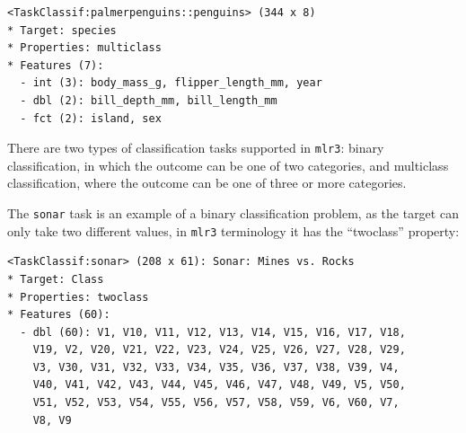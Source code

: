 \begin{Shaded}
\begin{Highlighting}[]
\SpecialCharTok{::} \NormalTok{)}
\end{Highlighting}
\end{Shaded}

\begin{verbatim}
<TaskClassif:palmerpenguins::penguins> (344 x 8)
* Target: species
* Properties: multiclass
* Features (7):
  - int (3): body_mass_g, flipper_length_mm, year
  - dbl (2): bill_depth_mm, bill_length_mm
  - fct (2): island, sex
\end{verbatim}

There are two types of classification tasks supported in \texttt{mlr3}:
binary classification, in which the outcome
can be one of two categories, and multiclass
classification, where the outcome can
be one of three or more categories.

The \texttt{sonar} task is an example of a binary classification
problem, as the target can only take two different values, in
\texttt{mlr3} terminology it has the ``twoclass'' property:

\begin{Shaded}
\begin{Highlighting}[]
\OtherTok{=} \NormalTok{(}\NormalTok{)}
\end{Highlighting}
\end{Shaded}

\begin{verbatim}
<TaskClassif:sonar> (208 x 61): Sonar: Mines vs. Rocks
* Target: Class
* Properties: twoclass
* Features (60):
  - dbl (60): V1, V10, V11, V12, V13, V14, V15, V16, V17, V18,
    V19, V2, V20, V21, V22, V23, V24, V25, V26, V27, V28, V29,
    V3, V30, V31, V32, V33, V34, V35, V36, V37, V38, V39, V4,
    V40, V41, V42, V43, V44, V45, V46, V47, V48, V49, V5, V50,
    V51, V52, V53, V54, V55, V56, V57, V58, V59, V6, V60, V7,
    V8, V9
\end{verbatim}

\begin{Shaded}
\begin{Highlighting}[]
\SpecialCharTok{$}
\end{Highlighting}
\end{Shaded}

